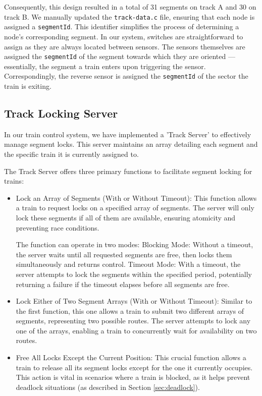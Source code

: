 \documentclass[12pt, titlepage]{article}
\begin{document}
    Consequently, this design resulted in a total of 31 segments on track A and 30 on track B. 
    We manually updated the \verb'track-data.c' file, ensuring that each node is assigned a \verb'segmentId'. 
    This identifier simplifies the process of determining a node's corresponding segment. 
    In our system, switches are straightforward to assign as they are always located between sensors. 
    The sensors themselves are assigned the \verb'segmentId' of the segment towards which they are oriented — essentially, the segment a train enters upon triggering the sensor. 
    Correspondingly, the reverse sensor is assigned the \verb'segmentId' of the sector the train is exiting.

    \subsection{Track Locking Server}
    In our train control system, we have implemented a 'Track Server' to effectively manage segment locks. 
    This server maintains an array detailing each segment and the specific train it is currently assigned to.

    The Track Server offers three primary functions to facilitate segment locking for trains:
    \begin{itemize}
        \item Lock an Array of Segments (With or Without Timeout): 
        This function allows a train to request locks on a specified array of segments. The server will only lock these segments if all of them are available, ensuring atomicity and preventing race conditions. 
        
        The function can operate in two modes:
        Blocking Mode: Without a timeout, the server waits until all requested segments are free, then locks them simultaneously and returns control.
        Timeout Mode: With a timeout, the server attempts to lock the segments within the specified period, potentially returning a failure if the timeout elapses before all segments are free.

        \item Lock Either of Two Segment Arrays (With or Without Timeout): 
        Similar to the first function, this one allows a train to submit two different arrays of segments, representing two possible routes. 
        The server attempts to lock any one of the arrays, enabling a train to concurrently wait for availability on two routes.

        \item Free All Locks Except the Current Position: 
        This crucial function allows a train to release all its segment locks except for the one it currently occupies. 
        This action is vital in scenarios where a train is blocked, as it helps prevent deadlock situations (as described in Section \ref{sec:deadlock}).
    \end{itemize}
\end{document}
